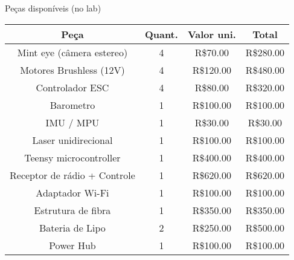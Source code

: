 \begin{frame}[t]{Peças disponíveis (no lab)}
  \transboxout[duration=0.5]
  \centering

  \begin{tabular}{c | c | c | c}
                Peça             & Quant. & Valor uni. & Total     \\ \hline
              Mint eye (câmera estereo)            & 4      & R\$70.00   & R\$280.00 \\
      Motores Brushless (12V)    & 4      & R\$120.00  & R\$480.00 \\
          Controlador ESC        & 4      & R\$80.00   & R\$320.00 \\
             Barometro           & 1      & R\$100.00  & R\$100.00 \\
             IMU / MPU           & 1      & R\$30.00   & R\$30.00  \\
        Laser unidirecional      & 1      & R\$100.00  & R\$100.00 \\
       Teensy microcontroller    & 1      & R\$400.00  & R\$400.00 \\
    Receptor de rádio + Controle & 1      & R\$620.00  & R\$620.00 \\
          Adaptador Wi-Fi        & 1      & R\$100.00  & R\$100.00 \\
         Estrutura de fibra      & 1      & R\$350.00  & R\$350.00 \\
          Bateria de Lipo        & 2      & R\$250.00  & R\$500.00 \\
             Power Hub           & 1      & R\$100.00  & R\$100.00
  \end{tabular}

\end{frame}



